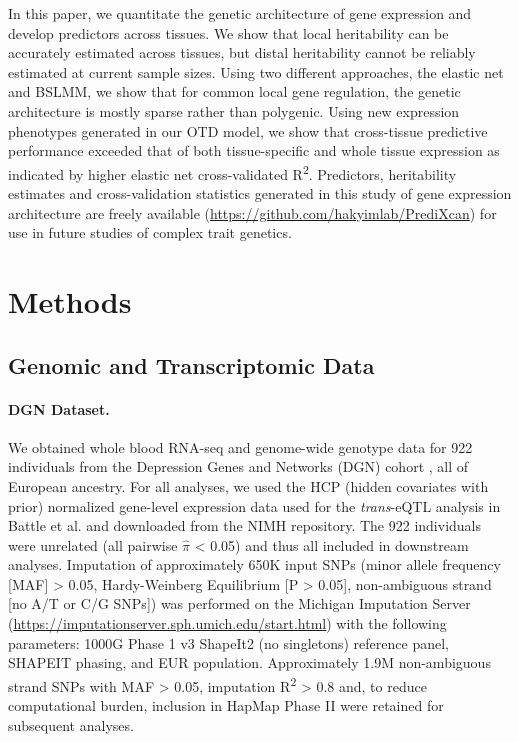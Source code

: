 \documentclass[10pt,letterpaper]{article}
\begin{document}
In this paper, we quantitate the genetic architecture of gene expression and develop predictors across tissues. We show that local heritability can be accurately estimated across tissues, but distal heritability cannot be reliably estimated at current sample sizes. Using two different approaches, the elastic net and BSLMM, we show that for common local gene regulation, the genetic architecture is mostly sparse rather than polygenic. Using new expression phenotypes generated in our OTD model, we show that cross-tissue predictive performance exceeded that of both tissue-specific and whole tissue expression as indicated by higher elastic net cross-validated R\textsuperscript{2}. Predictors, heritability estimates and cross-validation statistics generated in this study of gene expression architecture are freely available (\url{https://github.com/hakyimlab/PrediXcan}) for use in future studies of complex trait genetics.


\section*{Methods}
\subsection*{Genomic and Transcriptomic
Data}\label{genomic-and-transcriptomic-data}

\paragraph*{DGN Dataset.}\label{dgn-dataset}

We obtained whole blood RNA-seq and genome-wide genotype data for 922
individuals from the Depression Genes and Networks (DGN) cohort
\cite{Battle_2013}, all of European ancestry. For all analyses, we used the HCP
(hidden covariates with prior) normalized gene-level expression data
used for the \emph{trans}-eQTL analysis in Battle et al. \cite{Battle_2013} and
downloaded from the NIMH repository. The 922 individuals were unrelated
(all pairwise \(\hat{\pi}\) \textless{} 0.05) and thus all included in
downstream analyses. Imputation of approximately 650K input SNPs (minor
allele frequency {[}MAF{]} \textgreater{} 0.05, Hardy-Weinberg
Equilibrium {[}P \textgreater{} 0.05{]}, non-ambiguous strand {[}no A/T
or C/G SNPs{]}) was performed on the Michigan
Imputation Server
(\url{https://imputationserver.sph.umich.edu/start.html}) \cite{Howie_2012,Fuchsberger_2014}
with the following parameters: 1000G Phase 1 v3 ShapeIt2 (no singletons)
reference panel, SHAPEIT phasing, and EUR population. Approximately 1.9M
non-ambiguous strand SNPs with MAF \textgreater{} 0.05, imputation
R\textsuperscript{2} \textgreater{} 0.8 and, to reduce computational
burden, inclusion in HapMap Phase II were retained for subsequent
analyses.
\end{document}
